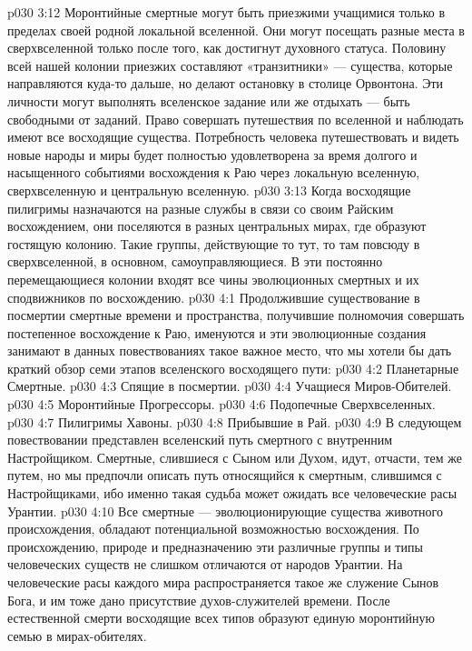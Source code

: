 \vs p030 3:12 Моронтийные смертные могут быть приезжими учащимися только в пределах своей родной локальной вселенной. Они могут посещать разные места в сверхвселенной только после того, как достигнут духовного статуса. Половину всей нашей колонии приезжих составляют «транзитники» --- существа, которые направляются куда\hyp{}то дальше, но делают остановку в столице Орвонтона. Эти личности могут выполнять вселенское задание или же отдыхать --- быть свободными от заданий. Право совершать путешествия по вселенной и наблюдать имеют все восходящие существа. Потребность человека путешествовать и видеть новые народы и миры будет полностью удовлетворена за время долгого и насыщенного событиями восхождения к Раю через локальную вселенную, сверхвселенную и центральную вселенную.
\vs p030 3:13 \pc {}\bibnobreakspace {} Когда восходящие пилигримы назначаются на разные службы в связи со своим Райским восхождением, они поселяются в разных центральных мирах, где образуют гостящую колонию. Такие группы, действующие то тут, то там повсюду в сверхвселенной, в основном, самоуправляющиеся. В эти постоянно перемещающиеся колонии входят все чины эволюционных смертных и их сподвижников по восхождению.
\vs p030 4:1 Продолжившие существование в посмертии смертные времени и пространства, получившие полномочия совершать постепенное восхождение к Раю, именуются  и эти эволюционные создания занимают в данных повествованиях такое важное место, что мы хотели бы дать краткий обзор семи этапов вселенского восходящего пути:
\vs p030 4:2 \bibnobreakspace Планетарные Смертные.
\vs p030 4:3 \bibnobreakspace Спящие в посмертии.
\vs p030 4:4 \bibnobreakspace Учащиеся Миров\hyp{}Обителей.
\vs p030 4:5 \bibnobreakspace Моронтийные Прогрессоры.
\vs p030 4:6 \bibnobreakspace Подопечные Сверхвселенных.
\vs p030 4:7 \bibnobreakspace Пилигримы Хавоны.
\vs p030 4:8 \bibnobreakspace Прибывшие в Рай.
\vs p030 4:9 \pc В следующем повествовании представлен вселенский путь смертного с внутренним Настройщиком. Смертные, слившиеся с Сыном или Духом, идут, отчасти, тем же путем, но мы предпочли описать путь относящийся к смертным, слившимся с Настройщиками, ибо именно такая судьба может ожидать все человеческие расы Урантии.
\vs p030 4:10 \pc {}\bibnobreakspace {} Все смертные --- эволюционирующие существа животного происхождения, обладают потенциальной возможностью восхождения. По происхождению, природе и предназначению эти различные группы и типы человеческих существ не слишком отличаются от народов Урантии. На человеческие расы каждого мира распространяется такое же служение Сынов Бога, и им тоже дано присутствие духов\hyp{}служителей времени. После естественной смерти восходящие всех типов образуют единую моронтийную семью в мирах\hyp{}обителях.
